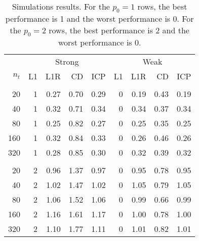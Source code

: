 \begin{table}

\caption{Simulations results. For the $p_0=1$ rows, the best performance is 1 and the worst performance is 0. For the $p_0=2$ rows, the best performance is 2 and the worst performance is 0. \label{tab:high-dim}}
\centering
\begin{tabular}[t]{rrrrrrrrr}
\toprule
\multicolumn{1}{c}{ } & \multicolumn{4}{c}{Strong} & \multicolumn{4}{c}{Weak} \\
\cmidrule(l{3pt}r{3pt}){2-5} \cmidrule(l{3pt}r{3pt}){6-9}
$n_t$ & L1 & L1R & CD & ICP & L1 & L1R & CD & ICP\\
\midrule
\addlinespace[0.3em]
\multicolumn{9}{l}{\textbf{$p_0=1$}}\\
\hspace{1em}20 & 1 & 0.27 & 0.70 & 0.29 & 0 & 0.19 & 0.43 & 0.19\\
\hspace{1em}40 & 1 & 0.32 & 0.71 & 0.34 & 0 & 0.34 & 0.37 & 0.34\\
\hspace{1em}80 & 1 & 0.25 & 0.82 & 0.27 & 0 & 0.25 & 0.35 & 0.25\\
\hspace{1em}160 & 1 & 0.32 & 0.84 & 0.33 & 0 & 0.26 & 0.46 & 0.26\\
\hspace{1em}320 & 1 & 0.28 & 0.85 & 0.30 & 0 & 0.32 & 0.39 & 0.32\\
\addlinespace[0.3em]
\multicolumn{9}{l}{\textbf{$p_0=2$}}\\
\hspace{1em}20 & 2 & 0.96 & 1.37 & 0.97 & 0 & 0.95 & 0.78 & 0.95\\
\hspace{1em}40 & 2 & 1.02 & 1.47 & 1.02 & 0 & 1.05 & 0.79 & 1.05\\
\hspace{1em}80 & 2 & 1.06 & 1.52 & 1.06 & 0 & 0.99 & 0.66 & 0.99\\
\hspace{1em}160 & 2 & 1.16 & 1.61 & 1.17 & 0 & 1.00 & 0.78 & 1.00\\
\hspace{1em}320 & 2 & 1.10 & 1.77 & 1.11 & 0 & 1.01 & 0.82 & 1.01\\
\bottomrule
\end{tabular}
\end{table}
